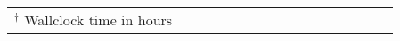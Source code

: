 \begin{table*}[tb!]
{{\begin{tabular}{@{}r@{}ll|llll|llll|llll|llll|llll|ll|}

           \multicolumn{10}{l}{$^\dagger$ Wallclock time in hours}\bigstrut
           \end{tabular}
    }}\vspace{-2.5em}
\end{table*}
        
